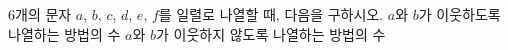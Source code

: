 $6$개의 문자 $a$, $b$, $c$, $d$, $e$, $f$를 일렬로 나열할 때, 다음을 구하시오.
 $a$와 $b$가 이웃하도록 나열하는 방법의 수
 $a$와 $b$가 이웃하지 않도록 나열하는 방법의 수
